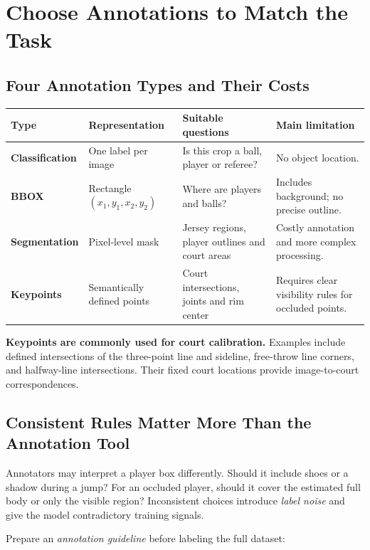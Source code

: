 \documentclass[11pt,a4paper,oneside]{report}
\newcommand{\eng}[1]{\textit{#1}}
\begin{document}
\section{Choose Annotations to Match the Task}

\subsection{Four Annotation Types and Their Costs}

\begin{tabularx}{\textwidth}{>{\bfseries\RaggedRight}p{2.7cm} Y Y Y}
\toprule
Type & Representation & Suitable questions & Main limitation \\
\midrule
Classification & One label per image & Is this crop a ball, player or referee? & No object location.\\
BBOX & Rectangle $(x_1,y_1,x_2,y_2)$ & Where are players and balls? & Includes background; no precise outline.\\
Segmentation & Pixel-level mask & Jersey regions, player outlines and court areas & Costly annotation and more complex processing.\\
Keypoints & Semantically defined points & Court intersections, joints and rim center & Requires clear visibility rules for occluded points.\\
\bottomrule
\end{tabularx}

\begin{plainBox}
\textbf{Keypoints are commonly used for court calibration.}\quad
Examples include defined intersections of the three-point line and sideline, free-throw line corners, and halfway-line intersections. Their fixed court locations provide image-to-court correspondences.
\end{plainBox}

\subsection{Consistent Rules Matter More Than the Annotation Tool}

Annotators may interpret a player box differently. Should it include shoes or a shadow during a jump? For an occluded player, should it cover the estimated full body or only the visible region? Inconsistent choices introduce \eng{label noise} and give the model contradictory training signals.

Prepare an \eng{annotation guideline} before labeling the full dataset:
\end{document}
